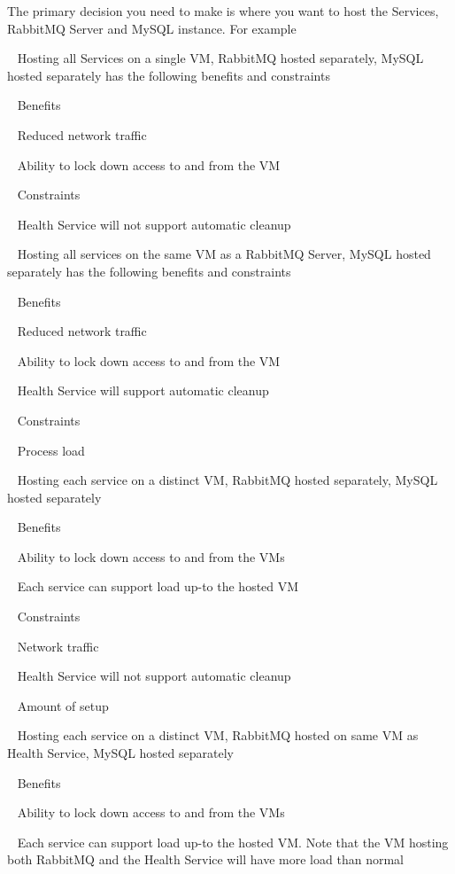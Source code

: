 \begin{DoxyItemize}
\item The primary decision you need to make is where you want to host the Services, Rabbit\+MQ Server and My\+SQL instance. For example
\item ~ Hosting all Services on a single VM, Rabbit\+MQ hosted separately, My\+SQL hosted separately has the following benefits and constraints
\item ~ Benefits
\item ~ Reduced network traffic
\item ~ Ability to lock down access to and from the VM
\item ~ Constraints
\item ~ Health Service will not support automatic cleanup
\item ~ Hosting all services on the same VM as a Rabbit\+MQ Server, My\+SQL hosted separately has the following benefits and constraints
\item ~ Benefits
\item ~ Reduced network traffic
\item ~ Ability to lock down access to and from the VM
\item ~ Health Service will support automatic cleanup
\item ~ Constraints
\item ~ Process load
\item ~ Hosting each service on a distinct VM, Rabbit\+MQ hosted separately, My\+SQL hosted separately
\item ~ Benefits
\item ~ Ability to lock down access to and from the VMs
\item ~ Each service can support load up-\/to the hosted VM
\item ~ Constraints
\item ~ Network traffic
\item ~ Health Service will not support automatic cleanup
\item ~ Amount of setup
\item ~ Hosting each service on a distinct VM, Rabbit\+MQ hosted on same VM as Health Service, My\+SQL hosted separately
\item ~ Benefits
\item ~ Ability to lock down access to and from the VMs
\item ~ Each service can support load up-\/to the hosted VM. Note that the VM hosting both Rabbit\+MQ and the Health Service will have more load than normal

\end{DoxyItemize}
